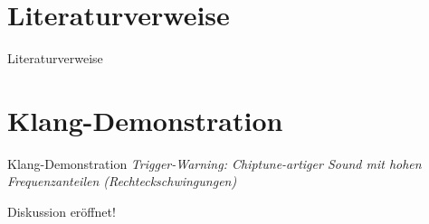 \documentclass[9pt]{beamer}
\begin{document}
\section{Literaturverweise}

\begin{frame}[t,allowframebreaks]{Literaturverweise}
  \nocite{RaspberryPiLtd24a}
  \nocite{Reuter24a}
  \nocite{Wikipedia24a}
  \nocite{MIDIAssociation24a}
  \nocite{Thach24a}
  \printbibliography
\end{frame}

\section{Klang-Demonstration}

\begin{frame}[t]{Klang-Demonstration}
  {\em Trigger-Warning: Chiptune-artiger Sound mit hohen
    Frequenzanteilen (Rechteckschwingungen)}
\end{frame}

\begin{frame}[t]
  \begin{center}
    \Huge{Diskussion eröffnet!}
  \end{center}
\end{frame}




\end{document}
